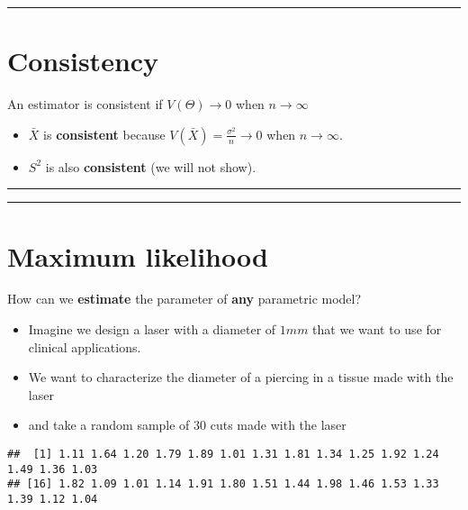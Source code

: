 \documentclass[
]{book}
\begin{document}
\begin{center}\rule{0.5\linewidth}{0.5pt}\end{center}

\hypertarget{consistency}{%
\section{Consistency}\label{consistency}}

An estimator is consistent if \(V(\Theta) \rightarrow 0\) when \(n \rightarrow \infty\)

\begin{itemize}
\item
  \(\bar{X}\) is \textbf{consistent} because \(V(\bar{X})=\frac{\sigma^2}{n}\rightarrow 0\) when \(n \rightarrow \infty\).
\item
  \(S^2\) is also \textbf{consistent} (we will not show).
\end{itemize}

\begin{center}\rule{0.5\linewidth}{0.5pt}\end{center}

\begin{center}\rule{0.5\linewidth}{0.5pt}\end{center}

\hypertarget{maximum-likelihood-1}{%
\section{Maximum likelihood}\label{maximum-likelihood-1}}

How can we \textbf{estimate} the parameter of \textbf{any} parametric model?

\begin{itemize}
\item
  Imagine we design a laser with a diameter of \(1mm\) that we want to use for clinical applications.
\item
  We want to characterize the diameter of a piercing in a tissue made with the laser
\item
  and take a random sample of \(30\) cuts made with the laser
\end{itemize}

\begin{verbatim}
##  [1] 1.11 1.64 1.20 1.79 1.89 1.01 1.31 1.81 1.34 1.25 1.92 1.24 1.49 1.36 1.03
## [16] 1.82 1.09 1.01 1.14 1.91 1.80 1.51 1.44 1.98 1.46 1.53 1.33 1.39 1.12 1.04
\end{verbatim}
\end{document}
